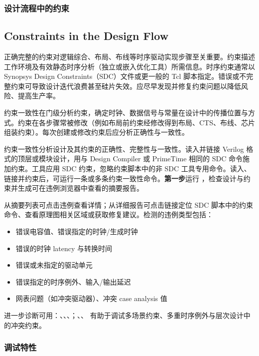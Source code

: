 \subsubsection{设计流程中的约束}
\subsection*{Constraints in the Design Flow}

正确完整的约束对逻辑综合、布局、布线等时序驱动实现步骤至关重要。约束描述工作环境及有效静态时序分析（独立或嵌入优化工具）所需信息。时序约束通常以 Synopsys Design Constraints（SDC）文件或更一般的 Tcl 脚本指定。错误或不完整约束可导致设计迭代浪费甚至硅片失效。应尽早发现并修复约束问题以降低风险、提高生产率。

约束一致性在门级分析约束，确定时钟、数据信号与常量在设计中的传播位置与方式。约束在各步骤常被修改（例如布局前约束经修改得到布局、CTS、布线、芯片组装约束）。每次创建或修改约束后应分析正确性与一致性。

约束一致性分析设计及其约束的正确性、完整性与一致性。读入并链接 Verilog 格式的顶层或模块设计，用与 Design Compiler 或 PrimeTime 相同的 SDC 命令施加约束。工具应用 SDC 约束，忽略约束脚本中的非 SDC 工具专用命令。读入、链接并约束后，可运行一条或多条约束一致性命令。\textbf{第一步}运行 ，检查设计与约束并生成可在违例浏览器中查看的摘要报告。

从摘要列表可点击违例查看详情；从详细报告可点击链接定位 SDC 脚本中的约束命令、查看原理图相关区域或获取修复建议。检测的违例类型包括：
\begin{itemize}
  \item 错误电容值、错误指定的时钟/生成时钟
  \item 错误的时钟 latency 与转换时间
  \item 错误或未指定的驱动单元
  \item 错误指定的时序例外、输入/输出延迟
  \item 网表问题（如冲突驱动器）、冲突 case analysis 值
\end{itemize}

进一步诊断可用：、、、；、、 有助于调试多场景约束、多重时序例外与层次设计中的冲突约束。

\subsubsection{调试特性}
